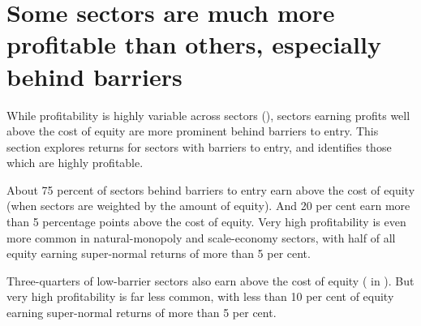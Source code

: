 


\section{Some sectors are much more profitable than others, especially behind barriers}

While profitability is highly variable across sectors (), sectors earning profits well above the cost of equity are more prominent behind barriers to entry. This section explores returns for sectors with barriers to entry, and identifies those which are highly profitable.

About 75 percent of sectors behind barriers to entry earn above the cost of equity (when sectors are weighted by the amount of equity). And 20 per cent earn more than 5 percentage points above the cost of equity.
Very high profitability is even more common in natural-monopoly and scale-economy sectors, with half of all equity earning super-normal returns of more than 5 per cent.

Three-quarters of low-barrier sectors also earn above the cost of equity ( in ).
But very high profitability is far less common, with less than 10 per cent of equity earning super-normal returns of more than 5 per cent. 

